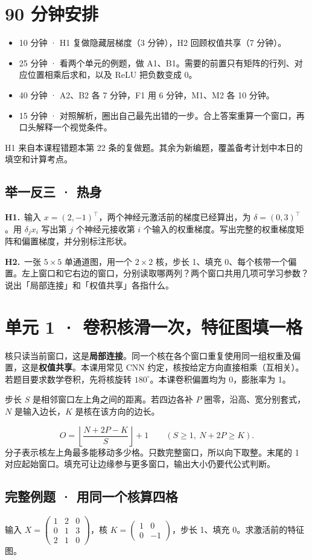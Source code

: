 \documentclass[UTF8,a4paper,11pt]{ctexart}
\newcommand{\CompactQuestion}[2]{\par\noindent\textbf{#1.}\ #2\par\vspace{.8em}}
\begin{document}
\section{90 分钟安排}
\begin{itemize}
\item 10 分钟 · H1 复做隐藏层梯度（3 分钟），H2 回顾权值共享（7 分钟）。
\item 25 分钟 · 看两个单元的例题，做 A1、B1。需要的前置只有矩阵的行列、对应位置相乘后求和，以及 ReLU 把负数变成 0。
\item 40 分钟 · A2、B2 各 7 分钟，F1 用 6 分钟，M1、M2 各 10 分钟。
\item 15 分钟 · 对照解析，圈出自己最先出错的一步。合上答案重算一个窗口，再口头解释一个视觉条件。
\end{itemize}
H1 来自本课程错题本第 22 条的复做题。其余为新编题，覆盖备考计划中本日的填空和计算考点。

\subsection{举一反三 · 热身}
\CompactQuestion{H1}{输入 $x=(2,-1)^\top$，两个神经元激活前的梯度已经算出，为 $\delta=(0,3)^\top$。用 $\delta_j x_i$ 写出第 $j$ 个神经元接收第 $i$ 个输入的权重梯度。写出完整的权重梯度矩阵和偏置梯度，并分别标注形状。}
\CompactQuestion{H2}{一张 $5\times5$ 单通道图，用一个 $2\times2$ 核，步长 1、填充 0、每个核带一个偏置。左上窗口和它右边的窗口，分别读取哪两列？两个窗口共用几项可学习参数？说出「局部连接」和「权值共享」各指什么。}
\clearpage
\section{单元 1 · 卷积核滑一次，特征图填一格}
核只读当前窗口，这是\textbf{局部连接}。同一个核在各个窗口重复使用同一组权重及偏置，这是\textbf{权值共享}。本课用常见 CNN 约定，核按给定方向直接相乘（互相关）。若题目要求数学卷积，先将核旋转 $180^\circ$。本课卷积偏置均为 0，膨胀率为 1。

步长 $S$ 是相邻窗口左上角之间的距离。若四边各补 $P$ 圈零，沿高、宽分别套式，$N$ 是输入边长，$K$ 是核在该方向的边长。

\[O=\left\lfloor\frac{N+2P-K}{S}\right\rfloor+1\qquad(S\ge1,\ N+2P\ge K).\]
分子表示核左上角最多能移动多少格。只数完整窗口，所以向下取整。末尾的 1 对应起始窗口。填充可让边缘参与更多窗口，输出大小仍要代公式判断。

\subsection{完整例题 · 用同一个核算四格}
输入 $X=\begin{pmatrix}1&2&0\\0&1&3\\2&1&0\end{pmatrix}$，核 $K=\begin{pmatrix}1&0\\0&-1\end{pmatrix}$，步长 1、填充 0。求激活前的特征图。
\end{document}
